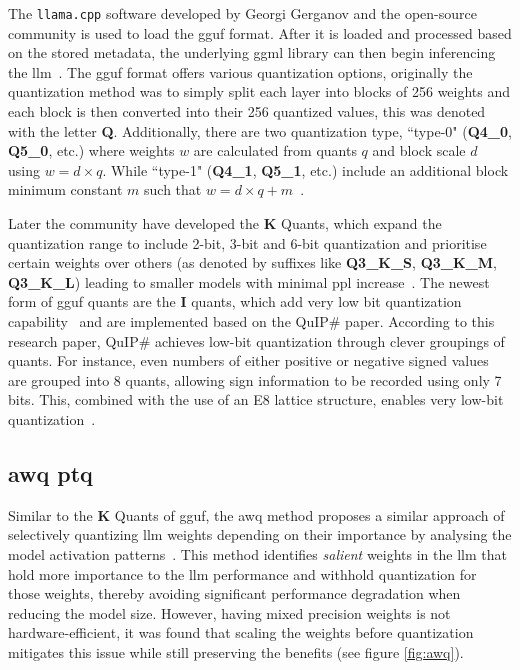 \documentclass{ifacconf}
\begin{document}
	The \texttt{llama.cpp} software developed by Georgi Gerganov and the open-source community is used to load the \gls{gguf} format. After it is loaded and processed based on the stored metadata, the underlying \gls{ggml} library can then begin inferencing the \gls{llm}~\cite{ggufgithub}. The \gls{gguf} format offers various quantization options, originally the quantization method was to simply split each layer into blocks of 256 weights and each block is then converted into their 256 quantized values, this was denoted with the letter \textbf{Q}. Additionally, there are two quantization type, ``type-0" (\textbf{Q4\_0}, \textbf{Q5\_0}, etc.) where weights $w$ are calculated from quants $q$ and block scale $d$ using $w = d \times q$. While ``type-1" (\textbf{Q4\_1}, \textbf{Q5\_1}, etc.) include an additional block minimum constant $m$ such that $w = d \times q + m$~\cite{ggufgithubquantdoc, ggufgithubkquantpr}. 
	
	Later the community have developed the \textbf{K} Quants, which expand the quantization range to include 2-bit, 3-bit and 6-bit quantization and prioritise certain weights over others (as denoted by suffixes like \textbf{Q3\_K\_S}, \textbf{Q3\_K\_M}, \textbf{Q3\_K\_L}) leading to smaller models with minimal \gls{ppl} increase~\cite{ggufgithubkquantpr}. The newest form of \gls{gguf} quants are the \textbf{I} quants, which add very low bit quantization capability~\cite{ggufgithubiquantpr} and are implemented based on the QuIP\# paper. According to this research paper, QuIP\# achieves low-bit quantization through clever groupings of quants. For instance, even numbers of either positive or negative signed values are grouped into 8 quants, allowing sign information to be recorded using only 7 bits. This, combined with the use of an E8 lattice structure, enables very low-bit quantization~\cite{tseng2024quipbetterllmquantization,ggufgithubiquantpr}. 
 
	
	\subsection{\gls{awq} \gls{ptq}}
	
	Similar to the \textbf{K} Quants of \gls{gguf}, the \gls{awq} method proposes a similar approach of selectively quantizing \gls{llm} weights depending on their importance by analysing the model activation patterns~\cite{lin2024awqactivationawareweightquantization}. This method identifies \textit{salient} weights in the \gls{llm} that hold more importance to the \gls{llm} performance and withhold quantization for those weights, thereby avoiding significant performance degradation when reducing the model size. However, having  mixed precision weights is not hardware-efficient, it was found that scaling the weights before quantization mitigates this issue while still preserving the benefits (see figure \ref{fig:awq}).
	
\end{document}
